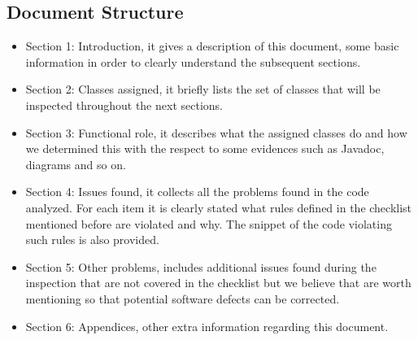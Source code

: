 \subsection{Document Structure}
\begin{itemize}
	\item Section 1: Introduction, it gives a description of this document, some basic information in order to clearly understand the subsequent sections.
	\item Section 2: Classes assigned, it briefly lists the set of classes that will be inspected throughout the next sections.
	\item Section 3: Functional role, it describes what the assigned classes do and how we determined this with the respect to some evidences such as Javadoc, diagrams and so on.
	\item Section 4: Issues found, it collects all the problems found in the code analyzed. For each item it is clearly stated what rules defined in the checklist mentioned before are violated and why. The snippet of the code violating such rules is also provided.
	\item Section 5: Other problems, includes additional issues found during the inspection that are not covered in the checklist but we believe that are worth mentioning so that potential software defects can be corrected.
	\item Section 6: Appendices, other extra information regarding this document. 
\end{itemize}
